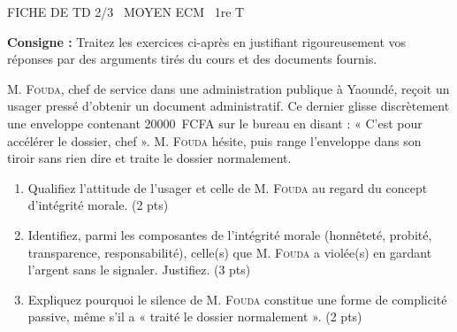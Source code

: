 \documentclass[11pt]{article}
\begin{document}
\begin{tcolorbox}[enhanced,colback=popink,colframe=popink,arc=10pt,boxrule=0pt,left=12pt,right=12pt,top=9pt,bottom=9pt]
{\color{white}\popxbold\small FICHE DE TD 2/3 \textbullet\ MOYEN \hfill ECM \textbullet\ 1re T\par}
\end{tcolorbox}
\vspace{4pt}
\noindent \textbf{Consigne :} Traitez les exercices ci-après en justifiant rigoureusement vos réponses par des arguments tirés du cours et des documents fournis.

\begin{exercice}
M. \textsc{Fouda}, chef de service dans une administration publique à Yaoundé, reçoit un usager pressé d'obtenir un document administratif. Ce dernier glisse discrètement une enveloppe contenant \SI{20000}{FCFA} sur le bureau en disant : « C'est pour accélérer le dossier, chef ». M. \textsc{Fouda} hésite, puis range l'enveloppe dans son tiroir sans rien dire et traite le dossier normalement.
\begin{enumerate}
    \item Qualifiez l'attitude de l'usager et celle de M. \textsc{Fouda} au regard du concept d'intégrité morale. (2 pts)
    \item Identifiez, parmi les composantes de l'intégrité morale (honnêteté, probité, transparence, responsabilité), celle(s) que M. \textsc{Fouda} a violée(s) en gardant l'argent sans le signaler. Justifiez. (3 pts)
    \item Expliquez pourquoi le silence de M. \textsc{Fouda} constitue une forme de complicité passive, même s'il a « traité le dossier normalement ». (2 pts)
\end{enumerate}
\end{exercice}
\end{document}
